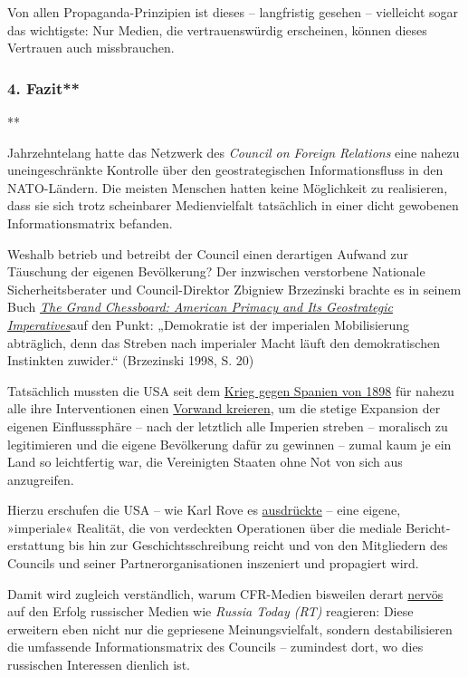 Von allen Propaganda-Prinzipien ist dieses -- langfristig gesehen --
vielleicht sogar das wichtigste: Nur Medien, die vertrauenswürdig
erscheinen, können dieses Vertrauen auch missbrauchen.

\hypertarget{4-fazit}{%
\subsubsection{4. Fazit**}\label{4-fazit}}

**

Jahrzehntelang hatte das Netzwerk des \emph{Council on Foreign
Relations} eine nahezu uneingeschränkte Kontrolle über den
geostrategischen Informationsfluss in den NATO-Ländern. Die meisten
Menschen hatten keine Möglichkeit zu realisieren, dass sie sich trotz
scheinbarer Medienvielfalt tatsächlich in einer dicht gewobenen
Informationsmatrix befanden.

Weshalb betrieb und betreibt der Council einen derartigen Aufwand zur
Täuschung der eigenen Bevölkerung? Der inzwischen verstorbene Nationale
Sicherheitsberater und Council-Direktor Zbigniew Brzezinski brachte es
in seinem Buch
\href{https://archive.org/details/TheGrandChessboardAmericanPrimacyAndItsGeostrategicImperatives1997ZbigniewBrzezinski}{\emph{The
Grand Chessboard: American Primacy and Its Geostrategic Imperatives}}auf
den Punkt: „Demokratie ist der imperialen Mobilisierung abträglich, denn
das Streben nach imperialer Macht läuft den demokratischen Instinkten
zuwider.`` (Brzezinski 1998, S. 20)

Tatsächlich mussten die USA seit dem
\href{https://de.wikipedia.org/wiki/Spanisch-Amerikanischer_Krieg}{Krieg
gegen Spanien von 1898} für nahezu alle ihre Interventionen einen
\href{https://www.amazon.de/Zerst\%C3\%B6rung-Hoffnung-Killing-Hope-Interventionen/dp/3889751415}{Vorwand
kreieren}, um die stetige Expansion der eigenen Einflusssphäre -- nach
der letztlich alle Imperien streben -- moralisch zu legitimieren und die
eigene Bevölkerung dafür zu gewinnen -- zumal kaum je ein Land so
leichtfertig war, die Vereinigten Staaten ohne Not von sich aus
anzugreifen.

Hierzu erschufen die USA -- wie Karl Rove es
\href{https://en.wikiquote.org/wiki/Karl_Rove}{ausdrückte} -- eine
eigene, »imperiale« Realität, die von verdeckten Operationen über die
mediale Bericht­erstattung bis hin zur Geschichts­schreibung reicht und
von den Mitgliedern des Councils und seiner Partner­organisationen
inszeniert und propagiert wird.

Damit wird zugleich verständlich, warum CFR-Medien bisweilen derart
\href{http://www.zeit.de/politik/ausland/2014-11/rt-deutsch-russland-propaganda-luegen}{nervös}
auf den Erfolg russischer Medien wie \emph{Russia Today (RT)} reagieren:
Diese erweitern eben nicht nur die gepriesene Mei­nungs­vielfalt,
sondern destabilisieren die umfassende Informations­matrix des Councils
-- zumindest dort, wo dies russischen Interessen dienlich ist.


